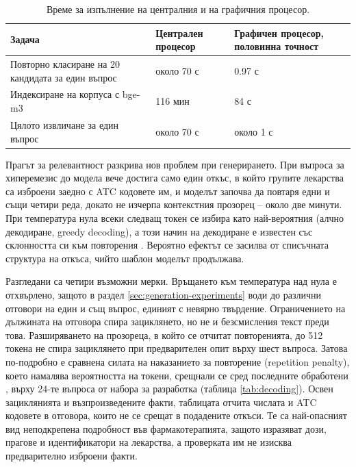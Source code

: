 \documentclass[12pt,a4paper]{article}
\makeatletter
\renewcommand\paragraph{\@startsection{paragraph}{4}{\z@}{1.5ex \@plus .5ex \@minus .2ex}{-1em}{\normalfont\normalsize\bfseries}}
\makeatother
\begin{document}
\begin{table}[ht]
\centering
\small
\caption{Време за изпълнение на централния и на графичния процесор.}
\label{tab:compute}
\setlength{\tabcolsep}{4pt}
\begin{tabular}{L{0.5\textwidth}C{0.18\textwidth}C{0.22\textwidth}}
\toprule
Задача & Централен процесор & Графичен процесор, половинна точност\\
\midrule
Повторно класиране на 20 кандидата за един въпрос & около 70 с & 0.97 с\\
Индексиране на корпуса с bge-m3 & 116 мин & 84 с\\
Цялото извличане за един въпрос & около 70 с & около 1 с\\
\bottomrule
\end{tabular}
\end{table}

\paragraph{Зацикляне при кратък контекст.} Прагът за релевантност разкрива нов проблем при генерирането. При въпроса за хиперемезис до модела вече достига само един откъс, в който групите лекарства са изброени заедно с ATC кодовете им, и моделът започва да повтаря едни и същи четири реда, докато не изчерпа контекстния прозорец -- около две минути. При температура нула всеки следващ токен се избира като най-вероятния (алчно декодиране, greedy decoding), а този начин на декодиране е известен със склонността си към повторения \cite{holtzman2020degeneration}. Вероятно ефектът се засилва от списъчната структура на откъса, чийто шаблон моделът продължава.

Разгледани са четири възможни мерки. Връщането към температура над нула е отхвърлено, защото в раздел \ref{sec:generation-experiments} води до различни отговори на един и същ въпрос, единият с невярно твърдение. Ограничението на дължината на отговора спира зациклянето, но не и безсмисления текст преди това. Разширяването на прозореца, в който се отчитат повторенията, до 512 токена не спира зациклянето при предварителен опит върху шест въпроса. Затова по-подробно е сравнена силата на наказанието за повторение (repetition penalty), което намалява вероятността на токени, срещнали се сред последните обработени \cite{keskar2019ctrl}, върху 24-те въпроса от набора за разработка (таблица \ref{tab:decoding}). Освен зациклянията и възпроизведените факти, таблицата отчита числата и ATC кодовете в отговора, които не се срещат в подадените откъси. Те са най-опасният вид неподкрепена подробност във фармакотерапията, защото изразяват дози, прагове и идентификатори на лекарства, а проверката им не изисква предварително изброени факти.
\end{document}
